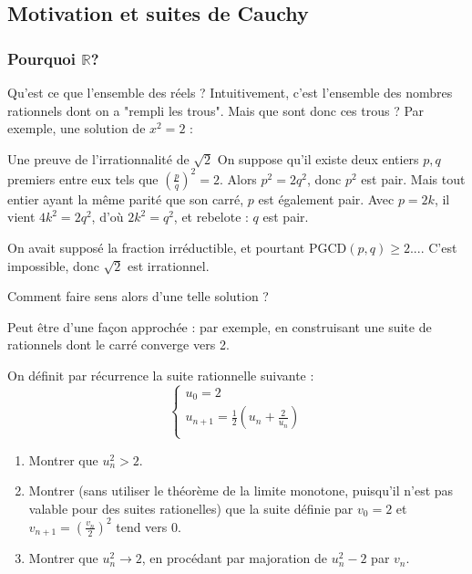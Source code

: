 \subsection{Motivation et suites de Cauchy}
\subsubsection{Pourquoi \texorpdfstring{$\mathbb{R}$}{R}?}
Qu'est ce que l'ensemble des réels ? 
Intuitivement, c'est l'ensemble des nombres rationnels dont on a "rempli les trous". Mais que sont donc ces trous ? Par exemple, une solution de $x^2=2$ :

\begin{boite}{Une preuve de l'irrationnalité de $\sqrt{2}$}
    On suppose qu'il existe deux entiers $p,q$ premiers entre eux tels que $\left(\frac{p}{q}\right)^{2}=2$. Alors $p^2=2q^2$, donc $p^2$ est pair. Mais tout entier ayant la même parité que son carré, $p$ est également pair. Avec $p=2k$, il vient $4k^2=2q^2$, d'où $2k^2=q^2$, et rebelote : $q$ est pair.

    On avait supposé la fraction irréductible, et pourtant $\mathrm{PGCD}(p,q) \geq 2...$. C'est impossible, donc $\sqrt{2}$ est irrationnel.
\end{boite}

Comment faire sens alors d'une telle solution ?

Peut être d'une façon approchée : par exemple, en construisant une suite de rationnels dont le carré converge vers 2. 

\begin{exo}
    On définit par récurrence la suite rationnelle suivante :
$$\begin{cases}
u_0=2\\
u_{n+1}= \frac{1}{2}(u_n+\frac{2}{u_n})\\
\end{cases}$$
\begin{enumerate}[font=\color{blue!50!green}]
    \item Montrer que $u_n^2>2$.
    \item Montrer (sans utiliser le théorème de la limite monotone, puisqu'il n'est pas valable pour des suites rationelles) que la suite définie par $v_0=2$ et $v_{n+1}=(\frac{v_n}{2})^2$ tend vers 0.
    \item Montrer que $u_n^2 \to 2$, en procédant par majoration de $u_n^2-2$ par $v_n$.
\end{enumerate}
\end{exo}

